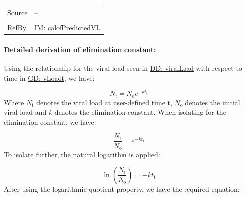 \documentclass[12pt]{article}
\begin{document}
\begin{minipage}{\textwidth}
\begin{tabular}{>{\raggedright}p{}>{\raggedright\arraybackslash}p{}}
\\ \midrule \\
Source & --
         
\\ \midrule \\
RefBy & \hyperref[IM:calofPredictedVL]{IM: calofPredictedVL}
        
\\ \bottomrule
\end{tabular}
\end{minipage}
\paragraph{Detailed derivation of elimination constant:}
\label{IM:calofElimConstDeriv}
Using the relationship for the viral load seen in \hyperref[DD:viralLoad]{DD: viralLoad} with respect to time in \hyperref[GD:vLoadt]{GD: vLoadt}, we have:

\begin{displaymath}
{N_{\text{t}}}={N_{\text{o}}} e^{-k {t_{\text{t}}}}
\end{displaymath}
Where ${N_{\text{t}}}$ denotes the viral load at user-defined time t, ${N_{\text{o}}}$ denotes the initial viral load and $k$ denotes the elimination constant. When isolating for the elimination constant,  we have:

\begin{displaymath}
\frac{{N_{\text{t}}}}{{N_{\text{o}}}}=e^{-k {t_{\text{t}}}}
\end{displaymath}
To isolate further, the natural logarithm is applied:

\begin{displaymath}
\ln\left(\frac{{N_{\text{t}}}}{{N_{\text{o}}}}\right)=-k {t_{\text{t}}}
\end{displaymath}
After using the logarithmic quotient property, we have the required equation:
\end{document}
